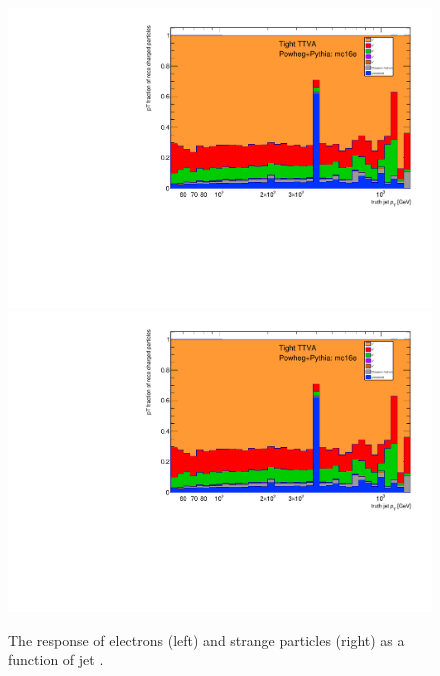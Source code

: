 \begin{figure}[b]
\centering
\includegraphics[scale=0.3, page=8]{figures/jet_comp_study_powheg_Tight_pTFraction_mc16e.pdf}
\includegraphics[scale=0.3, page=9]{figures/jet_comp_study_powheg_Tight_pTFraction_mc16e.pdf}
\caption {The response of electrons (left) and strange particles (right) as a function of jet \pT.}
\label{fig:r_electron_starnge}
\end{figure}

